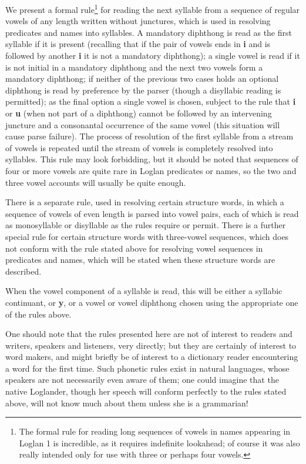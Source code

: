 \documentclass[12pt]{book}
\begin{document}
We present a  formal rule\footnote{The formal rule for reading long sequences of vowels in names appearing in Loglan 1 is incredible, as it requires indefinite lookahead;  of course it was also really intended only for use with three or perhaps four vowels.} for reading the next syllable from a sequence of  regular vowels of any length written without junctures, which is used in resolving predicates and names into syllables.  A mandatory diphthong is read as the first syllable if it is present (recalling that if the pair of vowels ends in {\bf i} and is followed by another {\bf i} it is not a mandatory diphthong); a single vowel is read if it is not initial in a mandatory diphthong and the next two vowels form a mandatory diphthong;  if neither of the previous two cases holds an optional diphthong is read by preference by the parser (though a disyllabic reading is permitted); as the final option a single vowel is chosen, subject to the rule that {\bf i} or {\bf u} (when not part of a diphthong) cannot be followed by an intervening juncture and a consonantal occurrence of the same vowel (this situation will cause parse failure).  The process of resolution of the first syllable from a  stream of vowels is repeated until the stream of vowels is completely resolved into syllables.
This rule may look forbidding, but it should be noted that sequences of four or more vowels are quite rare in Loglan predicates or names, so the two and three vowel accounts will usually be quite enough.

There is a separate rule, used in resolving certain structure words,  in which a sequence of vowels of even length is parsed into vowel pairs, each of which is read as monosyllable or disyllable as the rules require or permit.  There is a further special rule for certain structure words with three-vowel sequences, which does not conform with the rule stated above for resolving vowel sequences in predicates and names, which will be stated when these structure words are described.

When the vowel component of a syllable is read, this will be either a syllabic continuant, or {\bf y}, or a vowel or vowel diphthong chosen using the appropriate one of the rules above.

One should note that the rules presented here are not of interest to readers and writers, speakers and listeners, very directly;  but they are certainly of interest to word makers, and might briefly be of interest to a dictionary reader encountering a word for the first time.  Such phonetic rules exist in natural languages, whose speakers are not necessarily even aware of them;  one could imagine that the native Loglander, though her speech will conform perfectly to the rules stated above, will not know much about them unless she is a grammarian!
\end{document}
